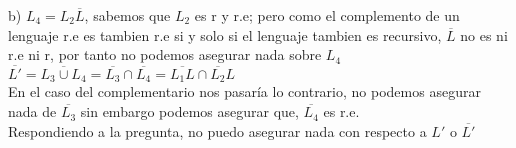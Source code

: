\documentclass{article}
\begin{document}
\hspace{1cm} b) $L_{4} = L_{2}\overline{L}$, sabemos que $L_{2}$ es r y r.e; pero como el complemento de un lenguaje r.e es tambien r.e si y solo si el lenguaje tambien es recursivo, $\overline{L}$ no es ni r.e ni r, por tanto no podemos asegurar nada sobre $L_{4}$\\

$\overline{L'} = \overline{L_{3} \cup L_{4}} = \overline{L_{3}} \cap \overline{L_{4}} = \overline{L_{1}L} \cap \overline{L_{2}}L$\\

En el caso del complementario nos pasaría lo contrario, no podemos asegurar nada de $\overline{L_{3}}$ sin embargo podemos asegurar que, $\overline{L_{4}}$ es r.e.\\

Respondiendo a la pregunta, no puedo asegurar nada con respecto a $L'$ o $\overline{L'}$
\end{document}
